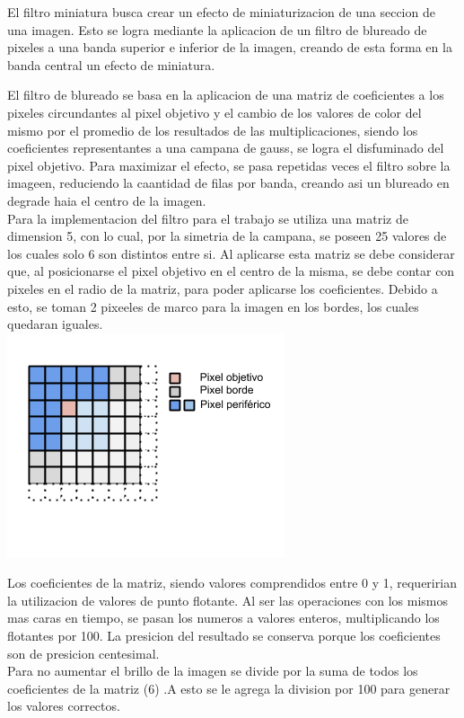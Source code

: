 \par
\bigskip
El filtro miniatura busca crear un efecto de miniaturizacion de una seccion de una imagen. Esto se logra mediante la aplicacion de un filtro de blureado de pixeles a una banda superior e inferior de la imagen, creando de esta forma en la banda central un efecto de miniatura. 

El filtro de blureado se basa en la aplicacion de una matriz de coeficientes a los pixeles circundantes al pixel objetivo y el cambio de los valores de color del mismo por el promedio de los resultados de las multiplicaciones, siendo los coeficientes representantes a una campana de gauss, se logra el disfuminado del pixel objetivo. Para maximizar el efecto, se pasa repetidas veces el filtro sobre la imageen, reduciendo la caantidad de filas por banda, creando asi un blureado en degrade haia el centro de la imagen.
\\
Para la implementacion del filtro para el trabajo se utiliza una matriz de dimension 5, con lo cual, por la simetria de la campana, se poseen 25 valores de los cuales solo 6 son distintos entre si. Al aplicarse esta matriz se debe considerar que, al posicionarse el pixel objetivo en el centro de la misma, se debe contar con pixeles en el radio de la matriz, para poder aplicarse los coeficientes. Debido a esto, se toman 2 pixeeles de marco para la imagen en los bordes, los cuales quedaran iguales.
\\
\includegraphics[scale=1]{imagenes/bordes-matriz-super.png} 

Los coeficientes de la matriz, siendo valores comprendidos entre 0 y 1, requeririan la utilizacion de valores de punto flotante. Al ser las operaciones con los mismos mas caras en tiempo, se pasan los numeros a valores enteros, multiplicando los flotantes por 100. La presicion del resultado se conserva porque los coeficientes son de presicion centesimal.
\\
Para no aumentar el brillo de la imagen se divide por la suma de todos los coeficientes de la matriz (6) .A esto se le agrega la division por 100 para generar los valores correctos.


